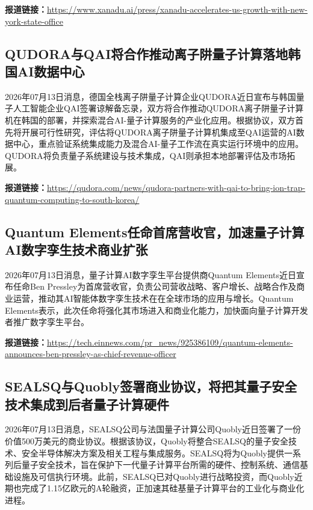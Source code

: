 \documentclass[12pt,a4paper]{ctexart}
\begin{document}
\noindent\textbf{报道链接：}\url{https://www.xanadu.ai/press/xanadu-accelerates-us-growth-with-new-york-state-office}

\subsection{ QUDORA与QAI将合作推动离子阱量子计算落地韩国AI数据中心 }

2026年07月13日消息，德国全栈离子阱量子计算企业QUDORA近日宣布与韩国量子人工智能企业QAI签署谅解备忘录，双方将合作推动QUDORA离子阱量子计算机在韩国的部署，并探索混合AI-量子计算服务的产业化应用。根据协议，双方首先将开展可行性研究，评估将QUDORA离子阱量子计算机集成至QAI运营的AI数据中心，重点验证系统集成能力及混合AI-量子工作流在真实运行环境中的应用。QUDORA将负责量子系统建设与技术集成，QAI则承担本地部署评估及市场拓展。

\noindent\textbf{报道链接：}\url{https://qudora.com/news/qudora-partners-with-qai-to-bring-ion-trap-quantum-computing-to-south-korea/}

\subsection{ Quantum Elements任命首席营收官，加速量子计算AI数字孪生技术商业扩张 }

2026年07月13日消息，量子计算AI数字孪生平台提供商Quantum Elements近日宣布任命Ben Pressley为首席营收官，负责公司营收战略、客户增长、战略合作及商业运营，推动其AI智能体数字孪生技术在在全球市场的应用与增长。Quantum Elements表示，此次任命将强化其市场进入和商业化能力，加快面向量子计算开发者推广数字孪生平台。

\noindent\textbf{报道链接：}\url{https://tech.einnews.com/pr\_news/925386109/quantum-elements-announces-ben-pressley-as-chief-revenue-officer}

\subsection{ SEALSQ与Quobly签署商业协议，将把其量子安全技术集成到后者量子计算硬件 }

2026年07月13日消息，SEALSQ公司与法国量子计算公司Quobly近日签署了一份价值500万美元的商业协议。根据该协议，Quobly将整合SEALSQ的量子安全技术、安全半导体解决方案及相关工程与集成服务。SEALSQ将为Quobly提供一系列后量子安全技术，旨在保护下一代量子计算平台所需的硬件、控制系统、通信基础设施及可信执行环境。此前，SEALSQ已对Quobly进行战略投资，而Quobly近期也完成了1.15亿欧元的A轮融资，正加速其硅基量子计算平台的工业化与商业化进程。
\end{document}

